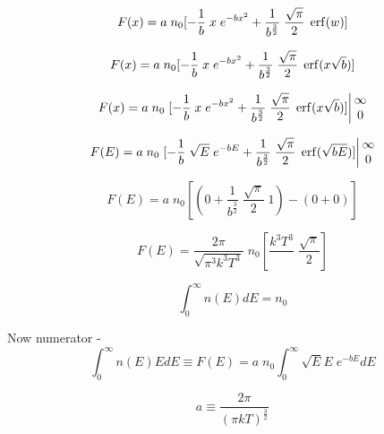 \documentclass[11pt,a4paper]{article}
\begin{document}
\begin{equation}
    F(x) = a \; n_0 [-\frac{1}{b} \; x \; e^{-bx^2} + \frac{1}{b^{\frac{3}{2}}} \; \frac{\sqrt{\pi}}{2} \; \erf(w)]
\end{equation}

\begin{equation}
    F(x) = a \; n_0 [-\frac{1}{b} \; x \; e^{-bx^2} + \frac{1}{b^{\frac{3}{2}}} \; \frac{\sqrt{\pi}}{2} \; \erf(x\sqrt{b})]
\end{equation}

\begin{equation}
    F(x) = a \; n_0 \left.[-\frac{1}{b} \; x \; e^{-bx^2} + \frac{1}{b^{\frac{3}{2}}} \; \frac{\sqrt{\pi}}{2} \; \erf(x\sqrt{b})]\right\vert \begin{matrix} \infty \\ 0 \end{matrix}
\end{equation}

\begin{equation}
    F(E) = a \; n_0 \left.[-\frac{1}{b} \; \sqrt{E} \; e^{-bE} + \frac{1}{b^{\frac{3}{2}}} \; \frac{\sqrt{\pi}}{2} \; \erf(\sqrt{bE})]\right\vert \begin{matrix} \infty \\ 0 \end{matrix}
\end{equation}

\begin{equation}
    F(E) = a \; n_0 [(0 + \frac{1}{b^{\frac{3}{2}}} \; \frac{\sqrt{\pi}}{2} \; 1) - (0 + 0)]
\end{equation}

\begin{equation}
    F(E) = \frac{2\pi}{\sqrt{\pi^3 k^3 T^3}} \; n_0 [\frac{k^3 T^3}{} \; \frac{\sqrt{\pi}}{2}]
\end{equation}

\vspace{\baselineskip}

\begin{equation}
    \int_0^{\infty} n(E)dE = n_0
\end{equation}

\newpage

\noindent Now numerator - 
\begin{equation}
    \int_0^{\infty} n(E) E dE \equiv F(E) = a \; n_0 \int_0^{\infty} \sqrt{E} E \; e^{-b E} dE 
\end{equation}

\begin{equation*}
    a \equiv \frac{2\pi}{(\pi kT)^{\frac{3}{2}}} 
\end{equation*}
\end{document}

